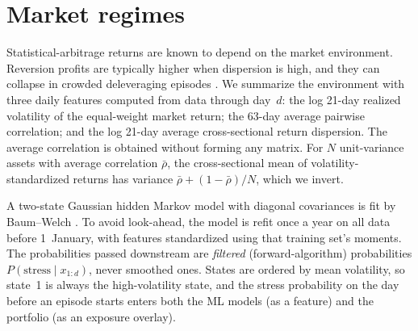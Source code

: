 \section{Market regimes}
\label{sec:regimes}

Statistical-arbitrage returns are known to depend on the market
environment. Reversion profits are typically higher when dispersion is
high, and they can collapse in crowded deleveraging episodes
\citep{khandani2011}. We summarize the environment with three daily
features computed from data through day~$d$: the log 21-day realized
volatility of the equal-weight market return; the 63-day average
pairwise correlation; and the log 21-day average cross-sectional return
dispersion. The average correlation is obtained without forming any
matrix. For $N$ unit-variance assets with average correlation
$\bar\rho$, the cross-sectional mean of volatility-standardized returns
has variance $\bar\rho + (1-\bar\rho)/N$, which we invert.

A two-state Gaussian hidden Markov model \citep{hamilton1989} with
diagonal covariances is fit by Baum--Welch \citep{rabiner1989}. To
avoid look-ahead, the model is refit once a year on all data before
1~January, with features standardized using that training set's
moments. The probabilities passed downstream are \emph{filtered}
(forward-algorithm) probabilities $P(\text{stress}\mid x_{1:d})$, never
smoothed ones. States are ordered by mean volatility, so state~1 is
always the high-volatility state, and the stress probability on the
day before an episode starts enters both the ML models (as a feature)
and the portfolio (as an exposure overlay).
